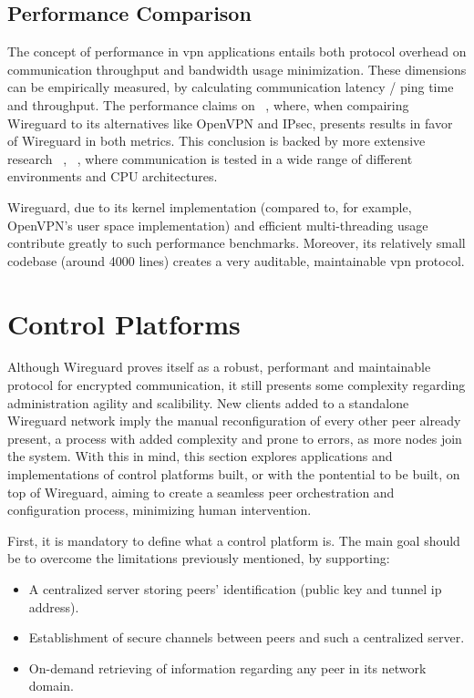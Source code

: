 \documentclass[11pt,twoside,a4paper]{report}
\begin{document}
\subsection{Performance Comparison}

The concept of performance in \ac{vpn} applications entails both protocol overhead on communication throughput and bandwidth usage minimization. These dimensions can be empirically measured, by calculating communication latency / ping time and throughput. The performance claims on ~\cite{donenfeld2017wireguard}, where, when compairing Wireguard to its alternatives like OpenVPN and IPsec, presents results in favor of Wireguard in both metrics. This conclusion is backed by more extensive research ~\cite{mackey2020performance}, ~\cite{osswald2020performance}, where communication is tested in a wide range of different environments and CPU architectures.

Wireguard, due to its kernel implementation (compared to, for example, OpenVPN's user space implementation) and efficient multi-threading usage contribute greatly to such performance benchmarks. Moreover, its relatively small codebase (around 4000 lines) creates a very auditable, maintainable \ac{vpn} protocol.


\section{Control Platforms}

Although Wireguard proves itself as a robust, performant and maintainable protocol for encrypted communication, it still presents some complexity regarding administration agility and scalibility. New clients added to a standalone Wireguard network imply the manual reconfiguration of every other peer already present, a process with added complexity and prone to errors, as more nodes join the system. With this in mind, this section explores applications and implementations of control platforms built, or with the pontential to be built, on top of Wireguard, aiming to create a seamless peer orchestration and configuration process, minimizing human intervention.

First, it is mandatory to define what a control platform is. The main goal should be to overcome the limitations previously mentioned, by supporting:

\begin{itemize}
     \item A centralized server storing peers' identification (public key and tunnel \ac{ip} address).
     \item Establishment of secure channels between peers and such a centralized server.
     \item On-demand retrieving of information regarding any peer in its network domain.
\end{itemize}
\end{document}
